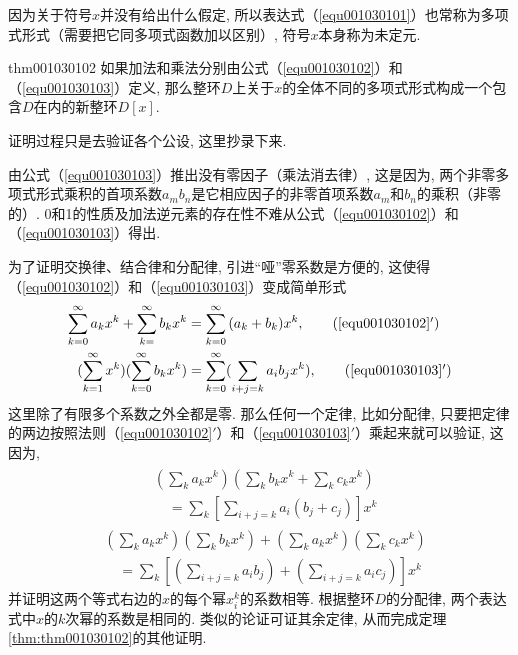 因为关于符号$x$并没有给出什么假定, 所以表达式（\ref{equ001030101}）也常称为多项式形式（需要把它同多项式函数加以区别）, 符号$x$本身称为未定元. 

\begin{theorem}{}{thm001030102}
如果加法和乘法分别由公式（\ref{equ001030102}）和（\ref{equ001030103}）定义, 那么整环$D$上关于$x$的全体不同的多项式形式构成一个包含$D$在内的新整环$D[x]$. 
\end{theorem}

证明过程只是去验证各个公设, 这里抄录下来. 

由公式（\ref{equ001030103}）推出没有零因子（乘法消去律）, 这是因为, 两个非零多项式形式乘积的首项系数$a_mb_n$是它相应因子的非零首项系数$a_m$和$b_n$的乘积（非零的）. 0和1的性质及加法逆元素的存在性不难从公式（\ref{equ001030102}）和（\ref{equ001030103}）得出. 

为了证明交换律、结合律和分配律, 引进“哑”零系数是方便的, 这使得（\ref{equ001030102}）和（\ref{equ001030103}）变成简单形式
\begin{gather}
\begin{align}
\sum_{k=0}^{\infty}{a_kx^k}+\sum_{k=}^{\infty}{b_kx^k} &= \sum_{k=0}^{\infty}{(a_k+b_k)x^k}, \tag{\ref{equ001030102}$'$} \\
(\sum_{k=1}^{\infty}{x^k})(\sum_{k=0}^{\infty}{b_kx^k})&=\sum_{k=0}^{\infty}(\sum_{i+j=k}{a_ib_jx^k}), \tag{\ref{equ001030103}$'$}
\end{align}
\end{gather}
这里除了有限多个系数之外全都是零. 那么任何一个定律, 比如分配律, 只要把定律的两边按照法则（\ref{equ001030102}$'$）和（\ref{equ001030103}$'$）乘起来就可以验证, 这因为, 
\begin{gather*}
\begin{split}
&(\sum_{k}{a_kx^k})(\sum_{k}{b_kx^k}+\sum_{k}{c_kx^k})\\
&\quad =\sum_{k}{[\sum_{i+j=k}{a_i(b_j+c_j)}]x^k}
\end{split}
\end{gather*}
\[
\begin{split}
&(\sum_{k}{a_kx^k})(\sum_{k}{b_kx^k})+(\sum_{k}{a_kx^k})(\sum_{k}{c_kx^k})\\
&\quad =\sum_{k}{[(\sum_{i+j=k}{a_ib_j})+(\sum_{i+j=k}{a_ic_j})]x^k}
\end{split}
\]
并证明这两个等式右边的$x$的每个幂$x_i^k$的系数相等. 根据整环$D$的分配律, 两个表达式中$x$的$k$次幂的系数是相同的. 类似的论证可证其余定律, 从而完成定理\ref{thm:thm001030102}的其他证明. 

